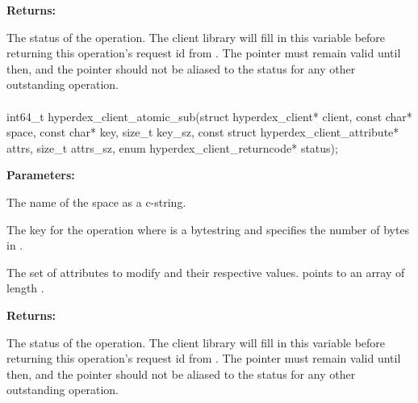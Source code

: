 \noindent\textbf{Returns:}
\begin{description}[labelindent=\widthof{{\code{status}}},leftmargin=*,noitemsep,nolistsep,align=right]
\item[\code{status}] The status of the operation.  The client library will fill in this variable before returning this operation's request id from .  The pointer must remain valid until then, and the pointer should not be aliased to the status for any other outstanding operation.
\end{description}

\paragraph{}
\label{api:c:atomic_sub}
\begin{ccode}
int64_t hyperdex_client_atomic_sub(struct hyperdex_client* client,
        const char* space,
        const char* key, size_t key_sz,
        const struct hyperdex_client_attribute* attrs, size_t attrs_sz,
        enum hyperdex_client_returncode* status);
\end{ccode}
\funcdesc 

\noindent\textbf{Parameters:}
\begin{description}[labelindent=\widthof{{\code{attrs}, \code{attrs\_sz}}},leftmargin=*,noitemsep,nolistsep,align=right]
\item[\code{space}] The name of the space as a c-string.
\item[\code{key}, \code{key\_sz}] The key for the operation where  is a bytestring and  specifies the number of bytes in .
\item[\code{attrs}, \code{attrs\_sz}] The set of attributes to modify and their respective values.   points to an array of length .
\end{description}

\noindent\textbf{Returns:}
\begin{description}[labelindent=\widthof{{\code{status}}},leftmargin=*,noitemsep,nolistsep,align=right]
\item[\code{status}] The status of the operation.  The client library will fill in this variable before returning this operation's request id from .  The pointer must remain valid until then, and the pointer should not be aliased to the status for any other outstanding operation.
\end{description}

